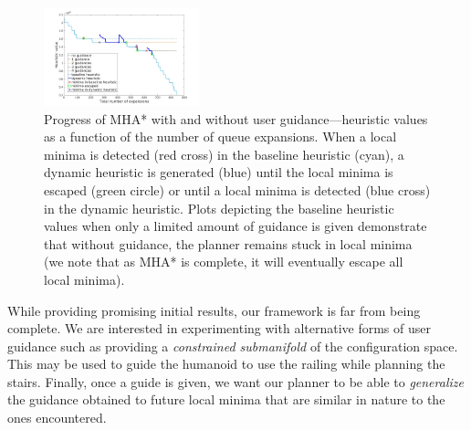 \documentclass[conference]{IEEEtran}
\begin{document}
\begin{figure}[tb]
  \centering
  	\includegraphics[width=0.4\textwidth]{fig/heuristic_value.jpg}
  	\vspace{-2mm}
  \caption{
		Progress of MHA* with and without user guidance---heuristic values as a function of the number of queue expansions.
		When a local minima is detected (red cross) in the baseline heuristic (cyan), a dynamic heuristic is generated (blue) until the local minima is escaped (green circle) or until a local minima is detected (blue cross) in the dynamic heuristic.
		Plots depicting the baseline heuristic values when only a limited amount of guidance is given demonstrate that without guidance, the planner remains stuck in local minima (we note that as MHA* is complete, it will eventually escape all local minima).
		}
\vspace{-5mm}
   	\label{fig:res}
\end{figure}

While providing promising initial results, our framework is far from being complete.
We are interested in experimenting with alternative forms of user guidance such as providing a \emph{constrained submanifold} of the configuration space. This may be used to guide the humanoid to use the railing while planning the stairs.
Finally, once a guide is given, we want our planner to be able to \emph{generalize} the guidance obtained to future local minima that are similar in nature to the ones encountered.


%


\end{document}
